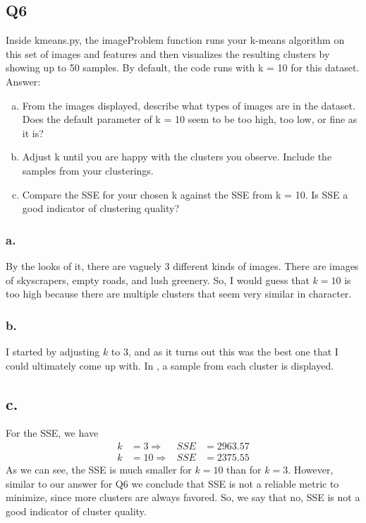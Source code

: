 \documentclass{article}
\theoremstyle{definition}
\begin{document}
    \subsection*{Q6}
        \begin{mdframed}
            Inside kmeans.py, the imageProblem function runs your k-means 
            algorithm on this set of images and features and then 
            visualizes the resulting clusters by showing up to 50 samples. 
            By default, the code runs with k = 10 for this dataset. Answer:
            \begin{enumerate}[a.]
                \item From the images displayed, describe what types of 
                    images are in the dataset. Does the default parameter 
                    of k = 10 seem to be too high, too low, or fine as it is?
                \item Adjust k until you are happy with the clusters you 
                    observe. Include the samples from your clusterings.
                \item Compare the SSE for your chosen k against the SSE 
                    from k = 10. Is SSE a good indicator of clustering 
                    quality?
            \end{enumerate}
        \end{mdframed}
        \subsubsection*{a.}
            By the looks of it, there are vaguely 3 different kinds of 
            images. There are images of skyscrapers, empty roads, and lush 
            greenery. So, I would guess that $k=10$ is too high because 
            there are multiple clusters that seem very similar in character.
        \subsubsection*{b.}
            I started by adjusting $k$ to 3, and as it turns out this was 
            the best one that I could ultimately come up with. In 
            , a sample from each cluster is displayed.
        \subsection*{c.}
            For the SSE, we have
            \begin{align*}
                k &= 3 \Rightarrow &SSE &= 2963.57 \\
                k &= 10 \Rightarrow &SSE &= 2375.55
            \end{align*}
            As we can see, the SSE is much smaller for $k=10$ than for
            $k=3$. However, similar to our answer for Q6 we conclude 
            that SSE is not a reliable metric to minimize, since more 
            clusters are always favored. So, we say that no, SSE is not 
            a good indicator of cluster quality.
\end{document}
